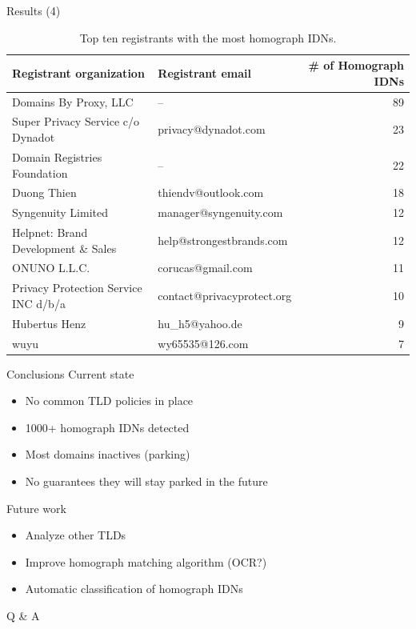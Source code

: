 \documentclass[usepdftitle=false]{beamer}
\begin{document}
\begin{frame}{Results (4)}
\begin{table}
\tiny
\centering
\begin{tabular}{llr}
\hline
Registrant organization              & Registrant email           & \# of Homograph IDNs \\ \hline
Domains By Proxy, LLC                & --                         & 89                   \\
Super Privacy Service c/o Dynadot    & privacy@dynadot.com        & 23                   \\
Domain Registries Foundation         & --                         & 22                   \\
Duong Thien                          & thiendv@outlook.com        & 18                   \\
Syngenuity Limited                   & manager@syngenuity.com     & 12                   \\
Helpnet: Brand Development \& Sales  & help@strongestbrands.com   & 12                   \\
ONUNO L.L.C.                         & corucas@gmail.com          & 11                   \\
Privacy Protection Service INC d/b/a & contact@privacyprotect.org & 10                   \\
Hubertus Henz                        & hu\_h5@yahoo.de            & 9                    \\
wuyu                                 & wy65535@126.com            & 7                    \\ \hline
\end{tabular}
\caption{Top ten registrants with the most homograph IDNs.}
\end{table}
\end{frame}

\begin{frame}{Conclusions}
Current state
\begin{itemize}
  \item No common TLD policies in place
  \item 1000+ homograph IDNs detected
  \item Most domains inactives (parking)
  \item No guarantees they will stay parked in the future
\end{itemize}
Future work
\begin{itemize}
  \item Analyze other TLDs
  \item Improve homograph matching algorithm (OCR?)
  \item Automatic classification of homograph IDNs
\end{itemize}
\end{frame}

\begin{frame}
\centering Q \& A
\end{frame}
\end{document}
